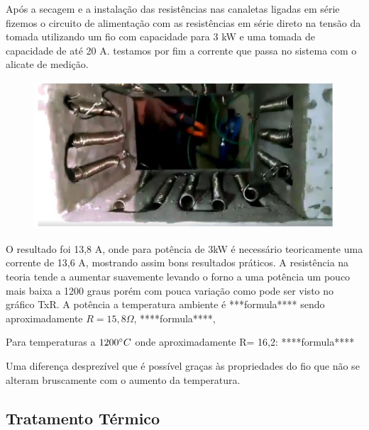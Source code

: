Após a secagem e a instalação das resistências nas canaletas ligadas em série fizemos o circuito de alimentação com as resistências em série direto na tensão da tomada utilizando um fio com capacidade para 3 kW e uma tomada de capacidade de até 20 A. testamos por fim a corrente que passa no sistema com o alicate de medição.
\begin{figure}[H]
	\centering
	\label{foto8}
	\includegraphics[keepaspectratio=true,scale=1.0]{figuras/alimentacao13.JPG}
\end{figure}

O resultado foi 13,8 A, onde para potência de 3kW é necessário teoricamente uma corrente de 13,6 A, mostrando assim bons resultados práticos. A resistência na teoria tende a aumentar suavemente levando o forno a uma potência um pouco mais baixa a 1200 graus porém com pouca variação como pode ser visto no gráfico TxR. A potência a temperatura ambiente é ***formula**** sendo aproximadamente $R = 15,8 \Omega$, ****formula****, 

Para temperaturas a $1200\degree C$ onde aproximadamente R= 16,2: 
****formula****

Uma diferença desprezível que é possível graças às propriedades do fio que não se alteram bruscamente com o aumento da temperatura.


\subsection{Tratamento Térmico}

